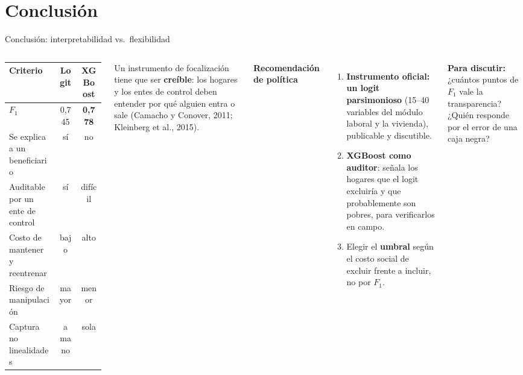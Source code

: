 \documentclass[aspectratio=169,10pt,xcolor=table]{beamer}
\newcommand{\tema}[1]{\textbf{#1}}
\begin{document}
\section{Conclusión}

\begin{frame}{Conclusión: interpretabilidad vs.\ flexibilidad}
\begin{columns}[T]
\footnotesize
\setlength{\tabcolsep}{4pt}
\begin{tabular}{@{}p{4.0cm}cc@{}}
\toprule
Criterio & \textcolor{clogit}{\textbf{Logit}} & \textcolor{cxgb}{\textbf{XGBoost}} \\
\midrule
$F_1$ & 0,745 & \textbf{0,778} \\
Se explica a un beneficiario & \textcolor{verde}{sí} & \textcolor{rojo}{no} \\
Auditable por un ente de control & \textcolor{verde}{sí} & \textcolor{rojo}{difícil} \\
Costo de mantener y reentrenar & \textcolor{verde}{bajo} & \textcolor{rojo}{alto} \\
Riesgo de manipulación & \textcolor{rojo}{mayor} & \textcolor{verde}{menor} \\
Captura no linealidades & \textcolor{rojo}{a mano} & \textcolor{verde}{sola} \\
\bottomrule
\end{tabular}

\vspace{2mm}
\footnotesize Un instrumento de focalización tiene que ser
\textbf{creíble}: los hogares y los entes de control deben entender por qué
alguien entra o sale (Camacho y Conover, 2011; Kleinberg et al., 2015).

\tema{Recomendación de política}
\small
\begin{enumerate}
  \item \textbf{Instrumento oficial: un logit parsimonioso} (15--40
    variables del módulo laboral y la vivienda), publicable y discutible.
  \item \textbf{XGBoost como auditor}: señala los hogares que el logit
    excluiría y que probablemente son pobres, para verificarlos en campo.
  \item Elegir el \textbf{umbral} según el costo social de excluir frente
    a incluir, no por $F_1$.
\end{enumerate}

\vspace{2mm}
\footnotesize\textbf{Para discutir:} ¿cuántos puntos de $F_1$ vale la
transparencia? ¿Quién responde por el error de una caja negra?
\end{columns}
\end{frame}
\end{document}
